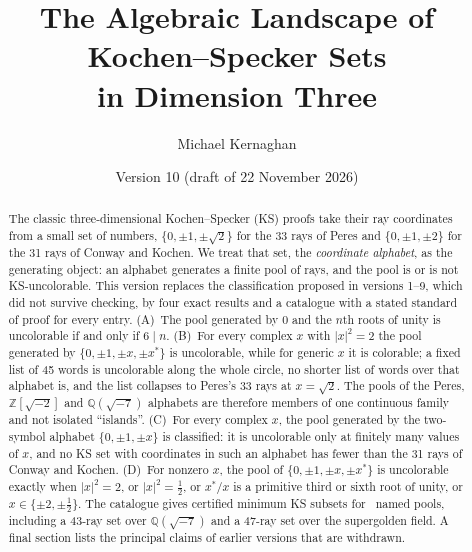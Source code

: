 \documentclass[11pt,a4paper]{article}
\title{The Algebraic Landscape of Kochen--Specker Sets\\in Dimension Three}
\author{Michael Kernaghan}
\date{Version 10 (draft of 22 November 2026)}
\theoremstyle{definition}
\theoremstyle{remark}
\newcommand{\Z}{\mathbb{Z}}
\newcommand{\Q}{\mathbb{Q}}
\begin{document}
\maketitle

\begin{abstract}
The classic three-dimensional Kochen--Specker (KS) proofs take their ray coordinates from a small
set of numbers, $\{0,\pm1,\pm\sqrt2\}$ for the 33 rays of Peres and $\{0,\pm1,\pm2\}$ for the 31
rays of Conway and Kochen.  We treat that set, the \emph{coordinate alphabet}, as the generating
object: an alphabet generates a finite pool of rays, and the pool is or is not KS-uncolorable.
This version replaces the classification proposed in versions 1--9, which did not survive
checking, by four exact results and a catalogue with a stated standard of proof for every entry.
(A)~The pool generated by $0$ and the $n$th roots of unity is uncolorable if and only if
$6\mid n$.  (B)~For every complex $x$ with $|x|^2=2$ the pool generated by
$\{0,\pm1,\pm x,\pm x^{*}\}$ is uncolorable, while for generic $x$ it is colorable; a fixed list of
45 words is uncolorable along the whole circle, no shorter list of words over that alphabet is,
and the list collapses to Peres's 33 rays at $x=\sqrt2$.  The pools of the Peres,
$\Z[\sqrt{-2}]$ and $\Q(\sqrt{-7})$ alphabets are therefore members of one continuous family and
not isolated ``islands''.  (C)~For every complex $x$, the pool generated by the two-symbol
alphabet $\{0,\pm1,\pm x\}$ is classified: it is uncolorable only at finitely many values of
$x$, and no KS set with coordinates in such an alphabet has fewer than the 31 rays of Conway and
Kochen.  (D)~For nonzero $x$, the pool of $\{0,\pm1,\pm x,\pm x^{*}\}$ is uncolorable exactly when $|x|^2=2$,
or $|x|^2=\tfrac12$, or $x^{*}/x$ is a primitive third or sixth root of unity, or
$x\in\{\pm2,\pm\tfrac12\}$.  The catalogue gives certified minimum KS subsets for
\ncertified\ named pools, including a 43-ray set over $\Q(\sqrt{-7})$ and a 47-ray set over the
supergolden field.  A final section lists the principal claims of earlier versions that are
withdrawn.
\end{abstract}







\end{document}
